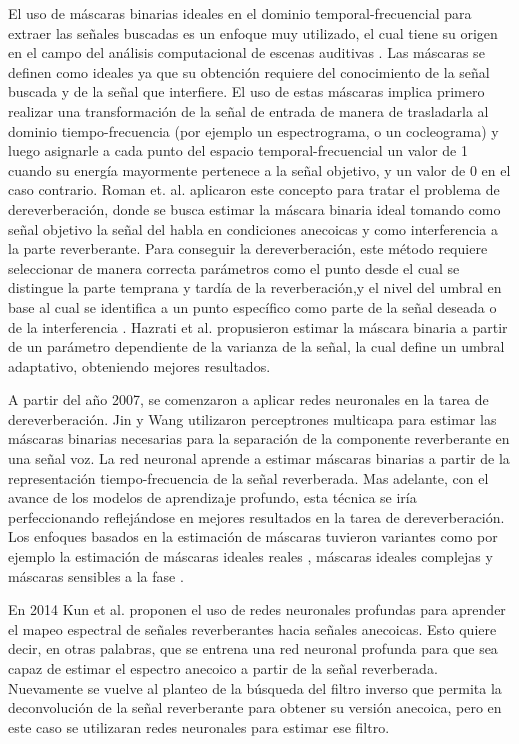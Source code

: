  
El uso de máscaras binarias ideales en el dominio temporal-frecuencial para extraer las señales buscadas \cite{binarymask} es un enfoque muy utilizado, el cual tiene su origen en el campo del análisis computacional de escenas auditivas \cite{ASA}. Las máscaras se definen como ideales ya que su obtención requiere del conocimiento de la señal buscada y de la señal que interfiere. El uso de estas máscaras implica primero realizar una transformación de la señal de entrada de manera de trasladarla al dominio tiempo-frecuencia (por ejemplo un espectrograma, o un cocleograma) y luego asignarle a cada punto del espacio temporal-frecuencial un valor de 1 cuando su energía mayormente pertenece a la señal objetivo, y un valor de 0 en el caso contrario. Roman et. al. \cite{rev_mask} aplicaron este concepto para tratar el problema de dereverberación, donde se busca estimar la máscara binaria ideal tomando como señal objetivo la señal del habla en condiciones anecoicas y como interferencia a la parte reverberante. Para conseguir la dereverberación, este método requiere seleccionar de manera correcta parámetros como el punto desde el cual se distingue la parte temprana y tardía de la reverberación,y el nivel del umbral en base al cual se identifica a un punto específico como parte de la señal deseada o de la interferencia \cite{parametros}. Hazrati et al. \cite{hazrati} propusieron estimar la máscara binaria a partir de un parámetro dependiente de la varianza de la señal, la cual define un umbral adaptativo, obteniendo mejores resultados. 

A partir del año 2007, se comenzaron a aplicar redes neuronales en la tarea de dereverberación. Jin y Wang \cite{MLP} utilizaron perceptrones multicapa para estimar las máscaras binarias necesarias para la separación de la componente reverberante en una señal voz. La red neuronal aprende a estimar máscaras binarias a partir de la representación tiempo-frecuencia de la señal reverberada. Mas adelante, con el avance de los modelos de aprendizaje profundo, esta técnica se iría perfeccionando reflejándose en mejores resultados en la tarea de dereverberación. Los enfoques basados en la estimación de máscaras tuvieron variantes como por ejemplo la estimación de máscaras ideales reales \cite{cIRM}, máscaras ideales complejas \cite{IRM} y máscaras sensibles a la fase \cite{GAN}.
  
En 2014 Kun et al. \cite{ezeKun} proponen el uso de redes neuronales profundas para aprender el mapeo espectral de señales reverberantes hacia señales anecoicas. Esto quiere decir, en otras palabras, que se entrena una red neuronal profunda para que sea capaz de estimar el espectro anecoico a partir de la señal reverberada. Nuevamente se vuelve al planteo de la búsqueda del filtro inverso que permita la deconvolución de la señal reverberante para obtener su versión anecoica, pero en este caso se utilizaran redes neuronales para estimar ese filtro. 

